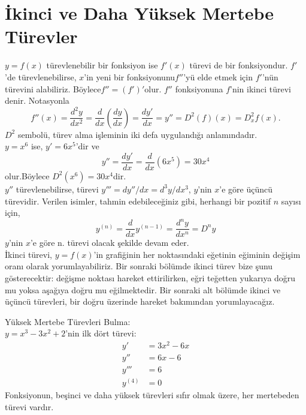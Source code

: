 \section{\protect İkinci ve Daha Yüksek Mertebe Türevler} \label{bolumetiketi}
$y=f(x)$ türevlenebilir bir fonksiyon ise $f'(x)$ türevi de bir fonksiyondur. $f'$'de türevlenebilirse, $x$'in yeni bir fonksiyonunu$f''$'yü elde etmek için $f'$'nün türevini alabiliriz. Böylece$f''=(f')'$olur. $f''$ fonksiyonuna $f$'nin ikinci türevi denir. Notasyonla	
	\begin{equation*}
	f''(x)=\frac{d^2y}{dx^2}=\frac{d}{dx}\left(\frac{dy}{dx}\right)=\frac{dy'}{dx}=y''=D^2(f)(x)=D_x ^2f(x).
	\end{equation*}
$D^2$ sembolü, türev alma işleminin iki defa uygulandığı anlamındadır.\\
	$y=x^6$ ise, $y'=6x^5$'dir ve
	\begin{equation*}
		y''=\frac{dy'}{dx}=\frac{d}{dx}(6x^5)=30x^4
	\end{equation*}
olur.Böylece $D^2(x^6)=30x^4$dir.\\
	$y''$ türevlenebilirse, türevi $y'''=dy''/dx=d^3y/dx^3$, $y$'nin $x$'e göre üçüncü türevidir. Verilen isimler, tahmin edebileceğiniz gibi, herhangi bir pozitif $n$ sayısı için,
	\begin{equation*}
	y^{(n)}=\frac{d}{dx}y^{(n-1)}=\frac{d^ny}{dx^n}=D^ny
	\end{equation*}
$y$'nin $x$'e göre n. türevi olacak şekilde devam eder.\\
	

	İkinci türevi, $y=f(x)$'in grafiğinin her noktasındaki eğetinin eğiminin değişim oranı olarak yorumlayabiliriz. Bir sonraki bölümde ikinci türev bize şunu gösterecektir: değişme noktası hareket ettirilirken, eğri teğetten yukarıya doğru mu yoksa aşağıya doğru mu eğilmektedir. Bir sonraki alt bölümde ikinci ve üçüncü türevleri, bir doğru üzerinde hareket bakımından yorumlayacağız.

\begin{ornek} Yüksek Mertebe Türevleri Bulma:\\
$y=x^3-3x^2+2$'nin ilk dört türevi:
	\begin{equation*}
	\begin{split}
	y'&=3x^2-6x\\
	y''&=6x-6\\
	y'''&=6\\
	y^{(4)}&=0
	\end{split}
	\end{equation*}
Fonksiyonun, beşinci ve daha yüksek türevleri sıfır olmak üzere, her mertebeden türevi vardır.
\end{ornek}

